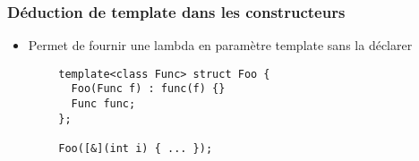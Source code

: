 \documentclass[C++.tex]{subfiles}
\begin{document}
\begin{frame}[fragile]
	\frametitle{Déduction de template dans les constructeurs}
	\begin{itemize}
		\item Permet de fournir une lambda en paramètre template sans la déclarer
	\end{itemize}

	\begin{verbatim}
		template<class Func> struct Foo {
		  Foo(Func f) : func(f) {}
		  Func func;
		};

		Foo([&](int i) { ... });
	\end{verbatim}


\end{frame}
\end{document}
